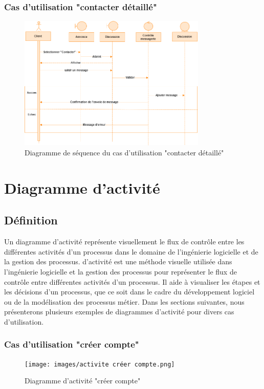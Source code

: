 \documentclass[edit,12pt,a4paper,ChapStyle,oneside,doubleinterligne]{report}
\begin{document}
\newpage
\subsubsection{Cas d'utilisation "contacter détaillé"}
\begin{figure}[h!]\label{fig:Diagramme cas 5d}
\centering
\includegraphics[width=0.8\textwidth]{images/contacter d.png}
\caption{Diagramme de séquence du cas d'utilisation "contacter détaillé"}
\end{figure}




\section{Diagramme d'activité}
\subsection{Définition}
Un diagramme d'activité représente visuellement le flux de contrôle entre les différentes activités d'un processus dans le domaine de l'ingénierie logicielle et de la gestion des processus.  d'activité est une méthode visuelle utilisée dans l'ingénierie logicielle et la gestion des processus pour représenter le flux de contrôle entre différentes activités d'un processus. Il aide à visualiser les étapes et les décisions d'un processus, que ce soit dans le cadre du développement logiciel ou de la modélisation des processus métier.
\cite{activite}
\newline Dans les sections suivantes, nous présenterons plusieurs exemples de diagrammes d'activité pour divers cas d'utilisation.
\clearpage
\subsubsection{Cas d'utilisation "créer compte"}
\begin{figure}[h!]\label{fig:activite cree}
    \centering
    \texttt{[image: images/activite créer compte.png]}
    \caption{Diagramme d'activité "créer compte"}
\end{figure}
\clearpage
\end{document}
